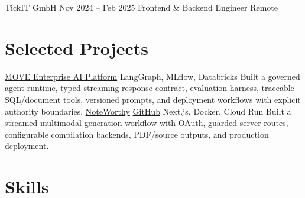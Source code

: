 \ResumeEntry
  {TickIT GmbH}
  {Nov 2024 -- Feb 2025}
  {Frontend \& Backend Engineer}
  {Remote}
\begin{ResumeItems}
\end{ResumeItems}

\section{Selected Projects}
\ProjectEntry
  {\href{https://www.giacomocappelletto.com/projects/move}{MOVE Enterprise AI Platform}}
  {LangGraph, MLflow, Databricks}
  {Built a governed agent runtime, typed streaming response contract, evaluation harness, traceable SQL/document tools, versioned prompts, and deployment workflows with explicit authority boundaries.}
\ProjectEntry
  {\href{https://noteworthy-giacomo-cappellettos-projects.vercel.app/}{NoteWorthy} \enspace\textbar\enspace \href{https://github.com/JJCAPPE/NoteWorthy}{GitHub}}
  {Next.js, Docker, Cloud Run}
  {Built a streamed multimodal generation workflow with OAuth, guarded server routes, configurable compilation backends, PDF/source outputs, and production deployment.}

\AthleticsAwards

\section{Skills}
